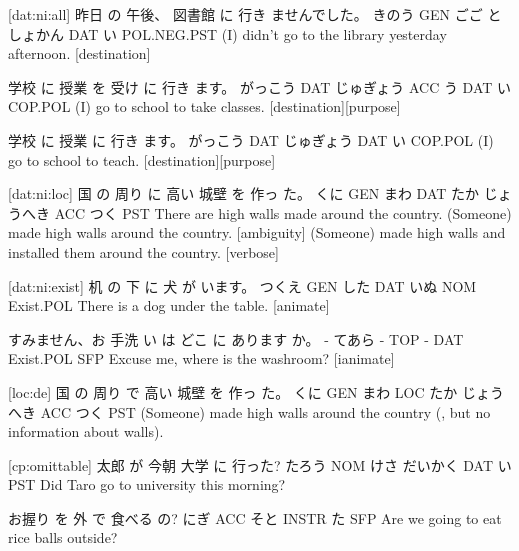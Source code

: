 [dat:ni:all]
昨日   の  午後、 図書館    に   行き ませんでした。
きのう GEN ごご   としょかん DAT い  POL.NEG.PST
(I) didn't go to the library yesterday afternoon. [destination]

学校    に   授業     を   受け に 行き ます。
がっこう DAT じゅぎょう ACC う  DAT い COP.POL
(I) go to school to take classes. [destination][purpose]

学校    に   授業      に  行き ます。
がっこう DAT じゅぎょう DAT い COP.POL
(I) go to school to teach. [destination][purpose]

[dat:ni:loc]
国   の  周り  に  高い 城壁      を  作っ た。
くに GEN まわ DAT たか じょうへき ACC つく PST
There are high walls made around the country.
(Someone) made high walls around the country. [ambiguity]
(Someone) made high walls and installed them around the country. [verbose]

[dat:ni:exist]
机    の   下  に   犬   が   います。
つくえ GEN した DAT いぬ NOM Exist.POL
There is a dog under the table. [animate]

すみません、お 手洗 い は どこ に  あります    か。
-          てあら - TOP -  DAT Exist.POL SFP
Excuse me, where is the washroom? [ianimate]

[loc:de]
国   の  周り  で  高い 城壁      を  作っ た。
くに GEN まわ LOC たか じょうへき ACC つく PST
(Someone) made high walls around the country (, but no information about walls).

[cp:omittable]
太郎   が  今朝 大学    に   行った?
たろう NOM けさ だいかく DAT い PST
Did Taro go to university this morning?

お握り を   外  で      食べる の?
にぎ   ACC そと INSTR  た SFP
Are we going to eat rice balls outside?
